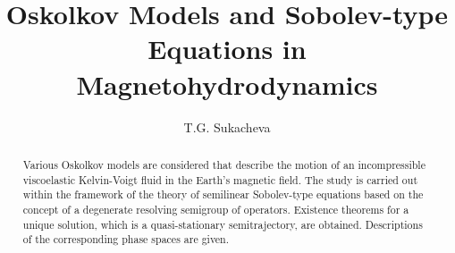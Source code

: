 \begin{englishtitle} %
\title{Oskolkov Models and Sobolev-type Equations in Magnetohydrodynamics}
\author{T.G. Sukacheva}

\maketitle

\begin{abstract}
Various Oskolkov models are considered that describe the motion of an incompressible viscoelastic Kelvin-Voigt fluid in the Earth's magnetic field. The study is carried out within the framework of the theory of semilinear Sobolev-type  equations based on the concept of a degenerate resolving semigroup of operators. Existence theorems for a unique solution, which is a quasi-stationary semitrajectory, are obtained. Descriptions of the corresponding phase spaces are given.

\end{abstract}
\end{englishtitle}

\iffalse

%
%

